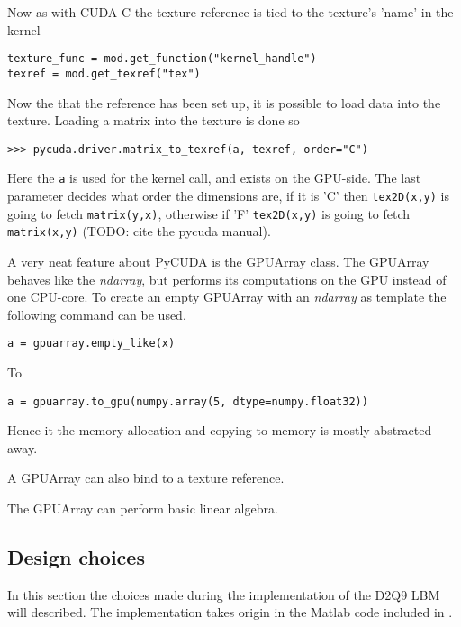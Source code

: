 Now as with CUDA C the texture reference is tied to the texture's 'name' in the kernel

\begin{verbatim}
texture_func = mod.get_function("kernel_handle")
texref = mod.get_texref("tex")
\end{verbatim}

Now the that the reference has been set up, it is possible to load data into the texture. Loading a matrix into the texture is done so

\begin{verbatim}
>>> pycuda.driver.matrix_to_texref(a, texref, order="C")
\end{verbatim}

Here the \texttt{a} is used for the kernel call, and exists on the GPU-side. The last parameter decides what order the dimensions are, if it is 'C' then \texttt{tex2D(x,y)} is going to fetch \texttt{matrix(y,x)}, otherwise if 'F' \texttt{tex2D(x,y)} is going to fetch \texttt{matrix(x,y)} (TODO: cite the pycuda manual).

A very neat feature about PyCUDA is the GPUArray class. The GPUArray behaves like the \textit{ndarray}, but performs its computations on the GPU instead of one CPU-core. To create an empty GPUArray with an \textit{ndarray} as template the following command can be used.

\begin{verbatim}
a = gpuarray.empty_like(x)
\end{verbatim}

To 

\begin{verbatim}
a = gpuarray.to_gpu(numpy.array(5, dtype=numpy.float32))
\end{verbatim}

Hence it the memory allocation and copying to memory is mostly abstracted away.

A GPUArray can also bind to a texture reference.

The GPUArray can perform basic linear algebra. 




\newpage
\subsection{Design choices}
In this section the choices made during the implementation of the D2Q9 LBM will described. The implementation takes origin in the Matlab code included in .

